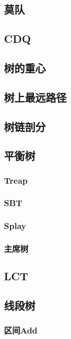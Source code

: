 \documentclass{article}
\begin{document}
\subsection{莫队}

\subsection{CDQ}

\subsection{树的重心}

\subsection{树上最远路径}

\subsection{树链剖分}

\subsection{平衡树}
\subsubsection{Treap}

\subsubsection{SBT}

\subsubsection{Splay}

\subsubsection{主席树}

\subsection{LCT}

\subsection{线段树}
\subsubsection{区间Add}

\end{document}
